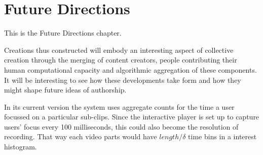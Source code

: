 \chapter{Future Directions}
\label{ch:future}

This is the Future Directions chapter.


Creations thus constructed will embody an interesting aspect of collective creation through the merging of content creators, people contributing their human computational capacity and algorithmic aggregation of these components. It will be interesting to see how these developments take form and how they might shape future ideas of authorship.


In its current version the system uses aggregate counts for the time a user focussed on a particular sub-clips. Since the interactive player is set up to capture users' focus every 100 milliseconds, this could also become the resolution of recording. That way each video parts would have $length/\delta$ time bins in a interest histogram.

